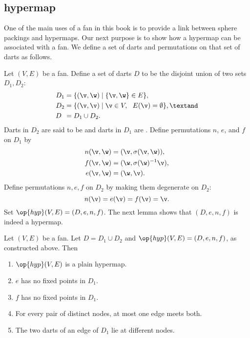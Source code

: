 \subsection{hypermap}
One of the main uses of a fan in this book is to provide a link between sphere
packings and hypermaps.  Our next purpose is to show how a hypermap can be associated
with a fan.   We define a set of darts and permutations on that set of darts as follows.

Let $(V,E)$ be a fan.  Define a set of darts $D$ to be the disjoint union of
two sets $D_1,D_2$:
\begin{align*}
D_1 &= \{(\v,\w)\mid \{\v,\w\}\in E\},\\
D_2 &= \{(\v,\v) \mid \v\in V,\ \ E(\v) = \emptyset\},\textand \\
D\phantom{_2}   &= D_1\cup D_2.
\end{align*}
Darts in $D_2$ are said to be  and darts in
$D_1$ are .
%
%
%
%
%
%
%
Define permutations $n$, $e$, and $f$ on $D_1$ by
\begin{align*}n(\v,\w) &= (\v,\sigma(\v,\w)),\\
f (\v,\w) &= (\w,\sigma(\w)^{-1} \v),\\
e (\v,\w) &= (\w,\v).
\end{align*}
Define permutations $n,e,f$ on $D_2$ by making them degenerate on $D_2$:
\[ 
n (\v) = e(\v) = f(\v) = \v.
\] 
Set %
$\op{hyp}(V,E)=(D,e,n,f)$. %
The next lemma shows that $(D,e,n,f)$ is indeed a hypermap.



\begin{lemma}[]\label{lemma:fan-plain}
Let $(V,E)$ be a fan.  Let $D = D_1\cup D_2$
and $\op{hyp}(V,E) = (D,e,n,f)$, as constructed above.  Then
\begin{enumerate}\wasitemize 
\item $\op{hyp}(V,E)$ is a plain hypermap.
\item  $e$ has no fixed
points in $D_1$.
\item  $f$ has no fixed points in $D_1$.
\item For every pair of distinct nodes,  at most one
edge  meets both.
\item The two darts of an edge of $D_1$ lie at different nodes.
\end{enumerate}\wasitemize 
{}%
\end{lemma}

